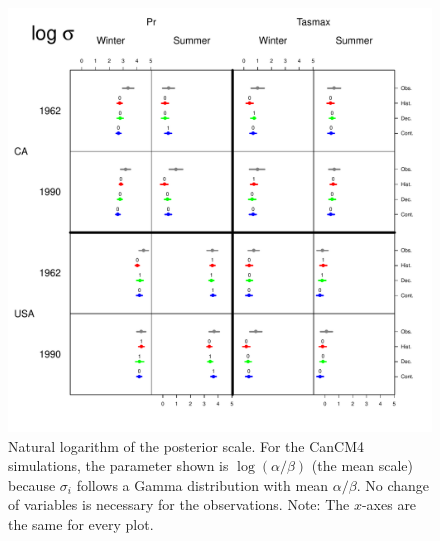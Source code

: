 \documentclass[12pt]{article}
\begin{document}
\begin{figure}
\begin{center}
\includegraphics[scale=0.72]{figs/log_sigma.pdf}
\end{center}
\caption{Natural logarithm of the posterior scale. For the CanCM4 simulations, the parameter shown is $\log (\alpha/\beta)$ (the mean scale) because $\sigma_i$ follows a Gamma distribution with mean $\alpha/\beta$. No change of variables is necessary for the observations. Note: The $x$-axes are the same for every plot.}
\label{sigma}
\end{figure}
\end{document}
